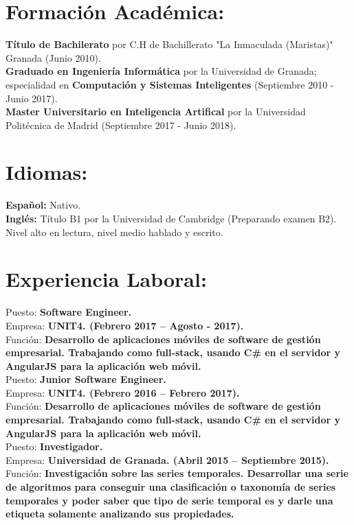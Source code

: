 \documentclass	[10pt,a4paper,oneside]{article}
\newcommand{\seccion}[1]{\vspace*{3mm}\section*{#1}\vspace*{-3mm}}
\begin{document}
\seccion{Formación Acad\'emica:}
\textbf{Título de Bachilerato} por C.H de Bachillerato "La Inmaculada (Maristas)" Granada (Junio 2010).\\
\textbf{Graduado en Ingenier\'ia Inform\'atica} por la Universidad de Granada;
especialidad en \textbf{Computación y Sistemas Inteligentes} (Septiembre 2010 - Junio 2017).\\
\textbf{Master Universitario en Inteligencia Artifical} por la Universidad Politécnica de Madrid (Septiembre 2017 - Junio 2018).\\


\seccion{Idiomas:}
\textbf{Español:} Nativo.\\
\textbf{Inglés:} Título B1 por la Universidad de Cambridge (Preparando examen B2). Nivel alto en lectura, nivel medio hablado y escrito.\\



\seccion{Experiencia Laboral:}

Puesto: \textbf{Software Engineer.}\\
Empresa: \textbf{UNIT4. (Febrero 2017 – Agosto - 2017).}\\
Función: \textbf{Desarrollo de aplicaciones móviles de software de gestión empresarial. Trabajando como full-stack, usando C\# en el servidor y AngularJS para la aplicación web móvil.}\\

Puesto: \textbf{Junior Software Engineer.}\\
Empresa: \textbf{UNIT4. (Febrero 2016 – Febrero 2017).}\\
Función: \textbf{Desarrollo de aplicaciones móviles de software de gestión empresarial. Trabajando como full-stack, usando C\# en el servidor y AngularJS para la aplicación web móvil.}\\

Puesto: \textbf{Investigador.}\\
Empresa: \textbf{Universidad de Granada. (Abril 2015 – Septiembre 2015).}\\
Función: \textbf{Investigación sobre las series temporales. Desarrollar una serie de algoritmos para conseguir una clasificación o taxonomía de series temporales y poder saber que tipo de serie temporal es y darle una etiqueta solamente analizando sus propiedades.}\\
\end{document}
